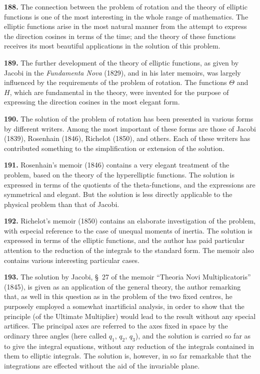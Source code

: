 \documentclass[11pt,a4paper]{article}
\theoremstyle{definition}
\begin{document}
\textbf{188.} The connection between the problem of rotation and the theory of elliptic functions is one of the most interesting in the whole range of mathematics. The elliptic functions arise in the most natural manner from the attempt to express the direction cosines in terms of the time; and the theory of these functions receives its most beautiful applications in the solution of this problem.

\textbf{189.} The further development of the theory of elliptic functions, as given by Jacobi in the \textit{Fundamenta Nova} (1829), and in his later memoirs, was largely influenced by the requirements of the problem of rotation. The functions $\Theta$ and $H$, which are fundamental in the theory, were invented for the purpose of expressing the direction cosines in the most elegant form.

\textbf{190.} The solution of the problem of rotation has been presented in various forms by different writers. Among the most important of these forms are those of Jacobi (1839), Rosenhain (1846), Richelot (1850), and others. Each of these writers has contributed something to the simplification or extension of the solution.

\textbf{191.} Rosenhain's memoir (1846) contains a very elegant treatment of the problem, based on the theory of the hyperelliptic functions. The solution is expressed in terms of the quotients of the theta-functions, and the expressions are symmetrical and elegant. But the solution is less directly applicable to the physical problem than that of Jacobi.

\textbf{192.} Richelot's memoir (1850) contains an elaborate investigation of the problem, with especial reference to the case of unequal moments of inertia. The solution is expressed in terms of the elliptic functions, and the author has paid particular attention to the reduction of the integrals to the standard form. The memoir also contains various interesting particular cases.

\textbf{193.} The solution by Jacobi, \S~27 of the memoir ``Theoria Novi Multiplicatoris'' (1845), is given as an application of the general theory, the author remarking that, as well in this question as in the problem of the two fixed centres, he purposely employed a somewhat inartificial analysis, in order to show that the principle (of the Ultimate Multiplier) would lead to the result without any special artifices. The principal axes are referred to the axes fixed in space by the ordinary three angles (here called $q_1$, $q_2$, $q_3$), and the solution is carried so far as to give the integral equations, without any reduction of the integrals contained in them to elliptic integrals. The solution is, however, in so far remarkable that the integrations are effected without the aid of the invariable plane.
\end{document}
